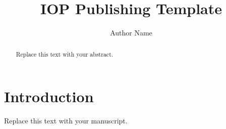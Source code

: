 \documentclass[12pt]{iopart}
\begin{document}
\title{IOP Publishing Template}
\author{Author Name}
\begin{abstract}
Replace this text with your abstract.
\end{abstract}
\section{Introduction}
Replace this text with your manuscript.
\end{document}
